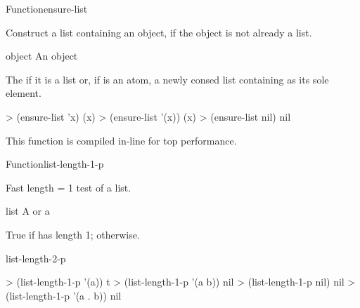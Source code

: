 \documentclass[10pt,twoside,english,pdftex]{article}
\newcommand{\inline}{This function is compiled in-line for top performance.}
\begin{document}

\begin{functiondoc}{Function}{ensure-list}{ 
    \returns{} }
%

\fnsyntax

\fnpurpose Construct a list containing an object, if the object is not
already a list.

\fnpackage {}

\fnmodule {}

\fnargs
\begin{args}{object}
\arg[object] An object
\end{args}

\fnreturns The  if it is a list or, if  is
an atom, a newly consed list containing  as its sole element.
  
\fnexamples
%
\W\supp
\begin{example}
> (ensure-list 'x)
(x)
> (ensure-list '(x))
(x)
> (ensure-list nil)
nil
\end{example}

\fnnote \inline

\end{functiondoc}


\begin{functiondoc}{Function}{list-length-1-p}%
  { 
    \returns{} }
%
%

\fnsyntax

\fnpurpose Fast length = 1 test of a list.

\fnpackage {}

\fnmodule {}

\fnargs
\begin{args}{list}
\arg[list] A  or a 
\end{args}

\fnreturns True if  has length 1; \nil{} otherwise.

\begin{alsos}{list-length-2-p}
\end{alsos}

\fnexamples
%
\W\supp
\begin{example}
> (list-length-1-p '(a))
t
> (list-length-1-p '(a b))
nil
> (list-length-1-p nil)
nil
> (list-length-1-p '(a . b))
nil
\end{example}

\end{functiondoc}
\end{document}
